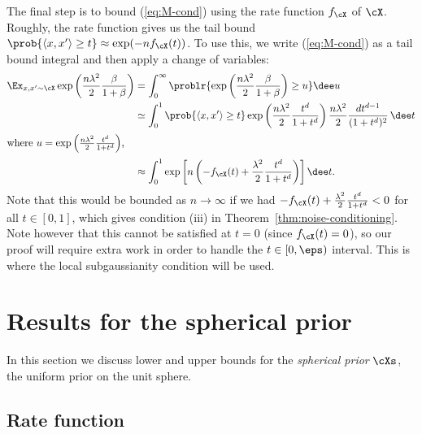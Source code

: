 \documentclass{article}
\begin{document}
The final step is to bound (\ref{eq:M-cond}) using the rate function $f_\cX$ of $\cX$. Roughly, the rate function gives us the tail bound $\prob{\langle x,x' \rangle \ge t} \approx \exp(-n f_\cX(t))$. To use this, we write (\ref{eq:M-cond}) as a tail bound integral and then apply a change of variables:
\begin{align*}
\Ex_{x,x' \sim \cX} \exp\left(\frac{n\lambda^2}{2} \frac{\beta}{1+\beta}\right)
&= \int_0^\infty \problr{\exp\left(\frac{n\lambda^2}{2} \frac{\beta}{1+\beta}\right) \ge u} \dee u \\
&\simeq \int_0^1 \prob{\langle x,x' \rangle \ge t} \exp\left(\frac{n\lambda^2}{2} \frac{t^d}{1+t^d}\right)\frac{n\lambda^2}{2} \frac{dt^{d-1}}{(1+t^d)^2}\, \dee t \\
\intertext{where $u = \exp\left(\frac{n \lambda^2}{2} \frac{t^d}{1+t^d}\right)$,}
&\approx \int_0^1 \exp\left[n\left( - f_\cX(t) + \frac{\lambda^2}{2} \frac{t^d}{1+t^d}\right)\right] \dee t.
\end{align*}
Note that this would be bounded as $n \to \infty$ if we had $- f_\cX(t) + \frac{\lambda^2}{2} \frac{t^d}{1+t^d} < 0$ for all $t \in [0,1]$, which gives condition (iii) in Theorem~\ref{thm:noise-conditioning}. Note however that this cannot be satisfied at $t = 0$ (since $f_\cX(t) = 0$), so our proof will require extra work in order to handle the $t \in [0,\eps)$ interval. This is where the local subgaussianity condition will be used.







\section{Results for the spherical prior}
\label{sec:sph}

In this section we discuss lower and upper bounds for the \emph{spherical prior} $\cXs$, the uniform prior on the unit sphere.


\subsection{Rate function}
\end{document}
